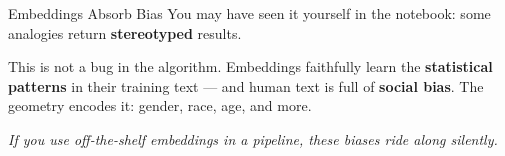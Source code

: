 \documentclass[aspectratio=169]{beamer}
\begin{document}
\begin{frame}{Embeddings Absorb Bias}
\vspace{0.2cm}
{\small You may have seen it yourself in the notebook: some analogies return
\textbf{stereotyped} results.}

\medskip
\begin{center}
\end{center}

\bigskip
{\small This is not a bug in the algorithm. Embeddings faithfully learn the
\textbf{statistical patterns} in their training text --- and human text is full of
\textbf{social bias}. The geometry encodes it: gender, race, age, and more.}

\medskip
{\small\textcolor{midgray}{\textit{If you use off-the-shelf embeddings in a pipeline, these
biases ride along silently.}}}
\end{frame}
\end{document}
